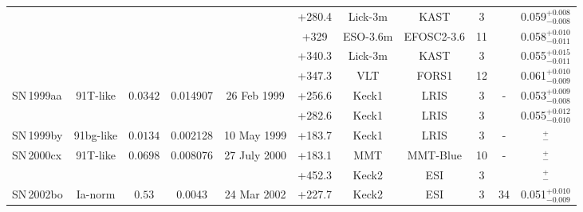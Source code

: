 \documentclass[fleqn,usenatbib]{mnras}
\begin{document}
\begin{table}
{\begin{tabular}{l c c cccccccc}
             &           &          &          &              & +280.4 & Lick-3m & KAST             & 3 & & 0.059$^{+0.008}_{-0.008}$ \\
             &           &          &          &              & +329   & ESO-3.6m & EFOSC2-3.6      & 11& & 0.058$^{+0.010}_{-0.011}$ \\
             &           &          &          &              & +340.3 & Lick-3m & KAST             & 3 & & 0.055$^{+0.015}_{-0.011}$ \\
             &           &          &          &              & +347.3 & VLT & FORS1                & 12& & 0.061$^{+0.010}_{-0.009}$ \\
    SN\,1999aa & 91T-like  & $0.0342$ & 0.014907 & 26 Feb 1999  & +256.6 & Keck1 & LRIS               & 3 & - & 0.053$^{+0.009}_{-0.008}$ \\
             &           &          &          &              & +282.6 & Keck1 & LRIS               & 3 & & 0.055$^{+0.012}_{-0.010}$ \\
    SN\,1999by & 91bg-like & $0.0134$ & 0.002128 & 10 May 1999  & +183.7 & Keck1 & LRIS               & 3 & - & $^{+}_{-}$ \\
    SN\,2000cx & 91T-like  & $0.0698$ & 0.008076 & 27 July 2000 & +183.1 & MMT & MMT-Blue             & 10&-& $^{+}_{-}$ \\
             &           &          &          &              & +452.3 & Keck2 & ESI                & 3 & & $^{+}_{-}$ \\
    SN\,2002bo & Ia-norm   & $0.53$   & 0.0043   & 24 Mar 2002  & +227.7 & Keck2    & ESI           & 3 & 34 & 0.051$^{+0.010}_{-0.009}$ \\

\end{tabular}}
\end{table}
\end{document}
